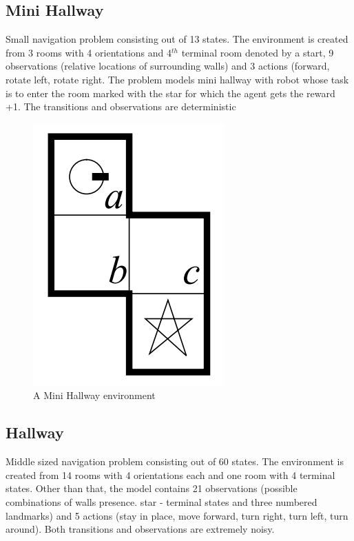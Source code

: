 \subsection{Mini Hallway \cite{Littman}}

Small navigation problem consisting out of 13 states. The environment is created from 3 rooms with 4 orientations and 4$^{th}$ terminal room denoted by a start, 9 observations (relative locations of surrounding walls) and 3 actions (forward, rotate left, rotate right.
The problem models mini hallway with robot whose task is to enter the room marked with the star for which the agent gets the reward +1. The transitions and observations are deterministic
\begin{figure}[h]
\caption{A Mini Hallway environment}
\centering
\includegraphics[scale=0.5]{MiniHallway.png}
\end{figure}

\subsection{Hallway \cite{Littman}}

Middle sized navigation problem consisting out of 60 states. The environment is created from 14 rooms with 4 orientations each and one room with 4 terminal states. Other than that, the model contains 21 observations (possible combinations of walls presence. star - terminal states and three numbered landmarks) and 5 actions (stay in place, move forward, turn right, turn left, turn around). Both transitions and observations are extremely noisy.

